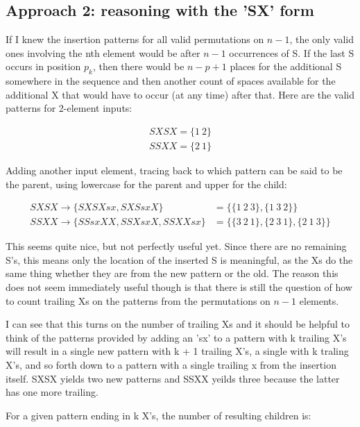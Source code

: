\documentclass{article}
\begin{document}
\subsection*{Approach 2: reasoning with the 'SX' form}

If I knew the insertion patterns for all valid permutations on $n - 1$, the only valid ones involving the nth element would be after $n - 1$ occurrences of S.  If the last S occurs in position $p_k$, then there would be $n - p + 1$ places for the additional S somewhere in the sequence and then another count of spaces available for the additional X that would have to occur (at any time) after that. Here are the valid patterns for 2-element inputs:

\begin{align*}
  SXSX = \{1~2\} \\
  SSXX = \{2~1\}
\end{align*}

Adding another input element, tracing back to which pattern can be said to be the parent, using lowercase for the parent and upper for the child:

\begin{align*}
  SXSX \rightarrow \{ SXSXsx, SXSsxX \} &= \{\{1~2~3\},\{1~3~2\}\} \\
  SSXX \rightarrow \{ SSsxXX,SSXsxX,SSXXsx \} &= \{\{3~2~1\},\{2~3~1\},\{2~1~3\}\}
\end{align*}

This seems quite nice, but not perfectly useful yet.  Since there are no remaining S's, this means only the location of the inserted S is meaningful, as the Xs do the same thing whether they are from the new pattern or the old.  The reason this does not seem immediately useful though is that there is still the question of how to count trailing Xs on the patterns from the permutations on $n - 1$ elements.

\par

I can see that this turns on the number of trailing Xs and it should be helpful to think of the patterns provided by adding an 'sx' to a pattern with k trailing X's will result in a single new pattern with k + 1 trailing X's, a single with k traling X's, and so forth down to a pattern with a single trailing x from the insertion itself.  SXSX yields two new patterns and SSXX yeilds three because the latter has one more trailing.

\par

For a given pattern ending in k X's, the number of resulting children is:
\end{document}
